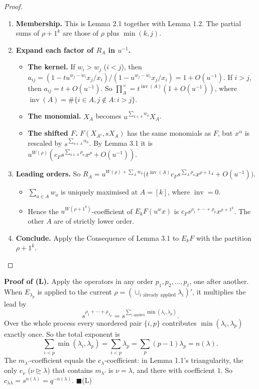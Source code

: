 \documentclass[11pt]{article}
\theoremstyle{definition}
\newcommand{\prodx}{\textstyle\prod^{\times}}
\newcommand{\dom}{\trianglerighteq}
\newcommand{\inv}{\operatorname{inv}}
\begin{document}
\begin{proof}
\leavevmode
\begin{enumerate}
\item \textbf{Membership.} This is Lemma 2.1 together with Lemma 1.2. The partial sums of $\rho + 1^k$ are those of $\rho$ plus $\min(k, j)$.
\item \textbf{Expand each factor of $R_A$ in $u^{-1}$.}
 \begin{itemize}
 \item \textbf{The kernel.} If $w_i > w_j$ ($i < j$), then $a_{ij} = (1 - t u^{w_j-w_i} x_j/x_i)/(1 - u^{w_j-w_i} x_j/x_i) = 1 + O(u^{-1})$. If $i > j$, then $a_{ij} = t + O(u^{-1})$. So $\prodx_A = t^{\inv(A)}(1 + O(u^{-1}))$, where $\inv(A) = \#\{i\in A, j\notin A : i > j\}$.
 \item \textbf{The monomial.} $X_A$ becomes $u^{\sum_{a\in A} w_a} X_A$.
 \item \textbf{The shifted $F$.} $F(X_{A^c}, sX_A)$ has the same monomials as $F$, but $x^\alpha$ is rescaled by $s^{\sum_{a\in A} \alpha_a}$. By Lemma 3.1 it is $u^{W(\rho)}(c_F s^{\sum_{a\in A} \rho_a} x^\rho + O(u^{-1}))$.
 \end{itemize}
\item \textbf{Leading orders.} So $R_A = u^{W(\rho) + \sum_A w_a}\bigl(t^{\inv(A)} c_F s^{\sum_A \rho_a} x^{\rho+1_A} + O(u^{-1})\bigr)$.
 \begin{itemize}
 \item $\sum_{a\in A} w_a$ is uniquely maximised at $A = [k]$, where $\inv = 0$.
 \item Hence the $u^{W(\rho+1^k)}$-coefficient of $E_kF(u^w x)$ is $c_F s^{\rho_1+\cdots+\rho_k} x^{\rho+1^k}$. The other $A$ are of strictly lower order.
 \end{itemize}
\item \textbf{Conclude.} Apply the Consequence of Lemma 3.1 to $E_kF$ with the partition $\rho + 1^k$. \qedhere
\end{enumerate}
\end{proof}

\noindent\textbf{Proof of (L).} Apply the operators in any order $p_1, p_2, \ldots, p_\ell$, one after another. When $E_{\lambda_p}$ is applied to the current $\rho = (\cup_{i \text{ already applied}} \lambda_i)'$, it multiplies the lead by
\[
s^{\rho_1+\cdots+\rho_{\lambda_p}} = s^{\sum_{i \text{ applied}} \min(\lambda_i, \lambda_p)}.
\]
Over the whole process every unordered pair $\{i, p\}$ contributes $\min(\lambda_i, \lambda_p)$ exactly once. So the total exponent is
\[
\sum_{i<p} \min(\lambda_i, \lambda_p) = \sum_{i<p} \lambda_p = \sum_p (p-1)\lambda_p = n(\lambda).
\]
The $m_{\lambda'}$-coefficient equals the $e_\lambda$-coefficient: in Lemma 1.1's triangularity, the only $e_\nu$ ($\nu \dom \lambda$) that contains $m_{\lambda'}$ is $\nu = \lambda$, and there with coefficient $1$. So $c_{\lambda\lambda} = s^{n(\lambda)} = q^{-n(\lambda)}$. \hfill$\blacksquare$(L)
\end{document}
